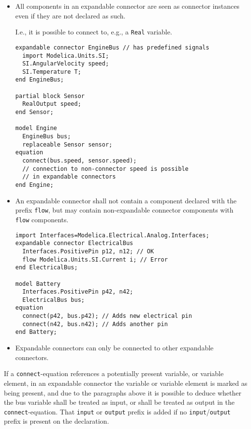 \begin{itemize}
\item
  All components in an expandable connector are seen as connector instances even if they are not declared as such.
  \begin{nonnormative}
  I.e., it is possible to connect to, e.g., a \lstinline!Real! variable.
  \end{nonnormative}
\begin{example}
\begin{lstlisting}[language=modelica]
expandable connector EngineBus // has predefined signals
  import Modelica.Units.SI;
  SI.AngularVelocity speed;
  SI.Temperature T;
end EngineBus;

partial block Sensor
  RealOutput speed;
end Sensor;

model Engine
  EngineBus bus;
  replaceable Sensor sensor;
equation
  connect(bus.speed, sensor.speed);
  // connection to non-connector speed is possible
  // in expandable connectors
end Engine;
\end{lstlisting}
\end{example}

\item
  An expandable connector shall not contain a component declared with the prefix \lstinline!flow!, but may contain non-expandable connector components with \lstinline!flow! components.
\begin{example}
\begin{lstlisting}[language=modelica]
import Interfaces=Modelica.Electrical.Analog.Interfaces;
expandable connector ElectricalBus
  Interfaces.PositivePin p12, n12; // OK
  flow Modelica.Units.SI.Current i; // Error
end ElectricalBus;

model Battery
  Interfaces.PositivePin p42, n42;
  ElectricalBus bus;
equation
  connect(p42, bus.p42); // Adds new electrical pin
  connect(n42, bus.n42); // Adds another pin
end Battery;
\end{lstlisting}
\end{example}

\item
  Expandable connectors can only be connected to other expandable connectors.
\end{itemize}

If a \lstinline!connect!-equation references a potentially present variable, or variable element, in an expandable connector the variable or variable element is marked as being present, and due to the paragraphs above it is possible to deduce whether the bus variable shall be treated as input, or shall be treated as output in the \lstinline!connect!-equation.
That \lstinline!input! or \lstinline!output! prefix is added if no \lstinline!input!/\lstinline!output! prefix is present on the declaration.

